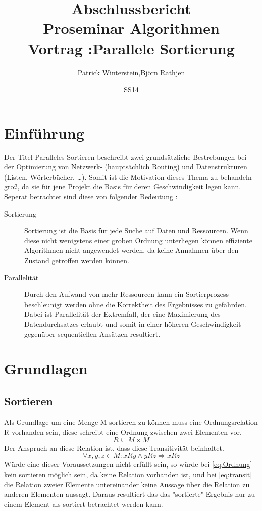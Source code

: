 \documentclass[11pt]{article}
\title{Abschlussbericht\\Proseminar Algorithmen\\Vortrag :Parallele Sortierung}
\author{Patrick Winterstein,Björn Rathjen}
\date{SS14}
\begin{document}
\maketitle
\newpage
\tableofcontents
\newpage
\listoffigures
\listoftables
\section{Einführung}
Der Titel Paralleles Sortieren beschreibt zwei grundsätzliche Bestrebungen bei der Optimierung von Netzwerk- (hauptsächlich Routing) und Datenstrukturen (Listen, Wörterbücher, \dots). Somit ist die Motivation dieses Thema zu behandeln groß, da sie für jene Projekt die Basis für deren Geschwindigkeit legen kann. Seperat betrachtet sind diese von folgender Bedeutung :
\begin{description}
\item[Sortierung] Sortierung ist die Basis für jede Suche auf Daten und Ressourcen. Wenn diese nicht wenigstens einer groben Ordnung unterliegen können effiziente Algorithmen nicht angewendet werden, da keine Annahmen über den Zustand getroffen werden können.
\item[Parallelität] Durch den Aufwand von mehr Ressourcen kann ein Sortierprozess beschleunigt werden ohne die Korrektheit des Ergebnisses zu gefährden. Dabei ist Parallelität der Extremfall, der eine Maximierung des Datendurchsatzes erlaubt und somit in einer höheren Geschwindigkeit gegenüber sequentiellen Ansätzen resultiert.
\end{description}
\section{Grundlagen}

\subsection{Sortieren}
Als Grundlage um eine Menge M sortieren zu können muss eine Ordnungsrelation R vorhanden sein, diese schreibt eine Ordnung zwischen zwei Elementen vor. 
\begin{equation}
R \subseteq M \times M
\label{eq:Ordnung}
\end{equation}
Der Anspruch an diese Relation ist, dass diese Transitivität beinhaltet.
\begin{equation}
\forall x,y,z \in M : xRy \wedge yRz \Rightarrow xRz
\label{eq:transit}
\end{equation}
Würde eine dieser Voraussetzungen nicht erfüllt sein, so würde bei \eqref{eq:Ordnung} kein sortieren möglich sein, da keine Relation vorhanden ist, und bei \eqref{eq:transit} die Relation zweier Elemente untereinander keine Aussage über die Relation zu anderen Elementen aussagt. Daraus resultiert das das "sortierte" Ergebnis nur zu einem Element als sortiert betrachtet werden kann.
\end{document}
